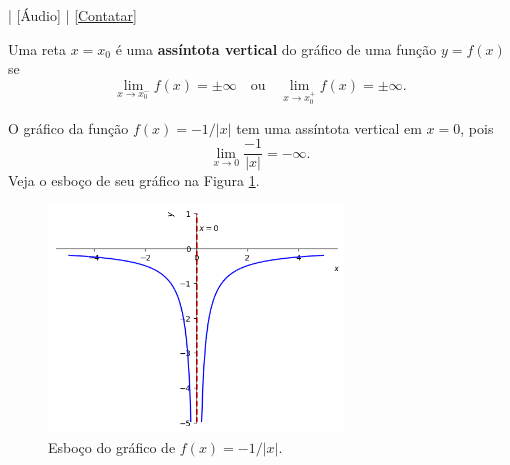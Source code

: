 \begin{flushright}
  [Vídeo] | [Áudio] | \href{https://phkonzen.github.io/notas/contato.html}{[Contatar]}
\end{flushright}

Uma reta $x=x_0$ é uma {\bf assíntota vertical} do gráfico de uma função $y = f(x)$ se
\begin{equation}
  \lim_{x\to x_0^-} f(x) = \pm\infty\quad\text{ou}\quad\lim_{x\to x_0^+} f(x) = \pm\infty.
\end{equation}

\begin{ex}
  O gráfico da função $f(x)=-1/|x|$ tem uma assíntota vertical em $x=0$, pois
  \begin{equation}
    \lim_{x\to 0} \frac{-1}{|x|} = -\infty.
  \end{equation}
  Veja o esboço de seu gráfico na Figura \ref{fig:ex_lim_assvert_1}.

  \begin{figure}[H]
    \centering
    \includegraphics[width=0.7\textwidth]{./cap_lim/dados/fig_ex_lim_assvert_1/fig_ex_lim_assvert_1}
    \caption{Esboço do gráfico de $f(x)=-1/|x|$.}
    \label{fig:ex_lim_assvert_1}
  \end{figure}  
\end{ex}

